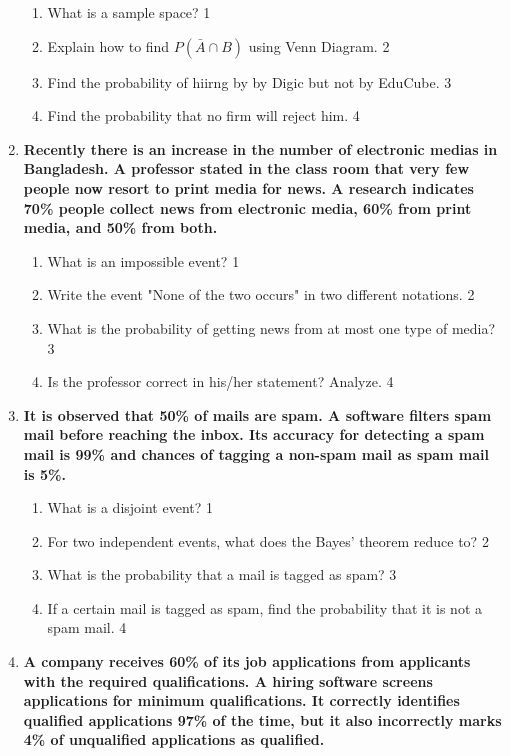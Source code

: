 \documentclass[a4paper,oneside, margin=1.4in]{book}
\begin{document}
\begin{enumerate}
  \begin{enumerate}
    \item
	What is a sample space? \hfill 1
    \item
	Explain how to find $P(\bar A \cap B)$ using Venn Diagram. \hfill 2
    \item  
	Find the probability of hiirng by by Digic but not by EduCube. \hfill 3
    \item
	Find the probability that no firm will reject him. \hfill 4
  \end{enumerate}

 \item
	  \textbf{Recently there is an increase in the number of electronic medias in Bangladesh. A professor stated in the class room that very few people now resort to print media for news. A research indicates 70\% people collect news from electronic media, 60\% from print media, and 50\% from both.} 
  
  \begin{enumerate}
    \item
	What is an impossible event? \hfill 1
    \item
	Write the event "None of the two occurs" in two different notations. \hfill 2
    \item  
	What is the probability of getting news from at most one type of media? \hfill 3
    \item
	Is the professor correct in his/her statement? Analyze. \hfill 4
  \end{enumerate}
  
  
     \item
	  \textbf{It is observed that 50\% of mails are spam. A software 
	  filters spam mail before reaching the inbox. Its accuracy for detecting a spam mail is 99\% and chances of tagging a non-spam mail as spam mail is 5\%.} 
  
  \begin{enumerate}
    \item
	What is a disjoint event? \hfill 1
    \item
	For two independent events, what does the Bayes' theorem reduce to? \hfill 2
    \item  
	What is the probability that a mail is tagged as spam?  \hfill 3
    \item
	If a certain mail is tagged as spam, find the probability that it is not a spam mail. \hfill 4
  \end{enumerate}
  
  \item
  \textbf{A company receives 60\% of its job applications from applicants with
  the required qualifications. A hiring software screens applications for minimum qualifications. It correctly identifies qualified applications 97\% of the time, but it also incorrectly marks 4\% of unqualified applications as qualified.}
  

\end{enumerate}
\end{document}
